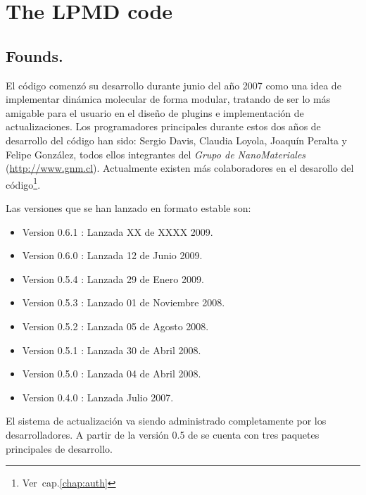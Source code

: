 \chapter{The LPMD code}
\label{chap:lpmd}

\section{Founds.}

El c\'odigo {\lpmd} comenz\'o su desarrollo durante junio del a\~no 2007 como una idea de implementar din\'amica molecular de forma modular, tratando de ser lo m\'as amigable para el usuario en el dise\~no de plugins e implementaci\'on de actualizaciones. Los programadores principales durante estos dos a\~nos de desarrollo del c\'odigo han sido: Sergio Davis, Claudia Loyola, Joaqu\'in Peralta y Felipe Gonz\'alez, todos ellos integrantes del \textit{Grupo de NanoMateriales} (\url{http://www.gnm.cl}). Actualmente existen m\'as colaboradores en el desarollo del c\'odigo\footnote{Ver~cap.\ref{chap:auth}}.

Las versiones que se han lanzado en formato estable son:

\begin{itemize}
 \item Version 0.6.1 : Lanzada XX de XXXX 2009.
 \item Version 0.6.0 : Lanzada 12 de Junio 2009.
 \item Version 0.5.4 : Lanzada 29 de Enero 2009.
 \item Version 0.5.3 : Lanzado 01 de Noviembre 2008.
 \item Version 0.5.2 : Lanzada 05 de Agosto 2008.
 \item Version 0.5.1 : Lanzada 30 de Abril 2008.
 \item Version 0.5.0 : Lanzada 04 de Abril 2008.
 \item Version 0.4.0 : Lanzada Julio 2007.
\end{itemize}

El sistema de actualizaci\'on va siendo administrado completamente por los desarrolladores. A partir de la versi\'on 0.5 de {\lpmd} se cuenta con tres paquetes principales de desarrollo.

